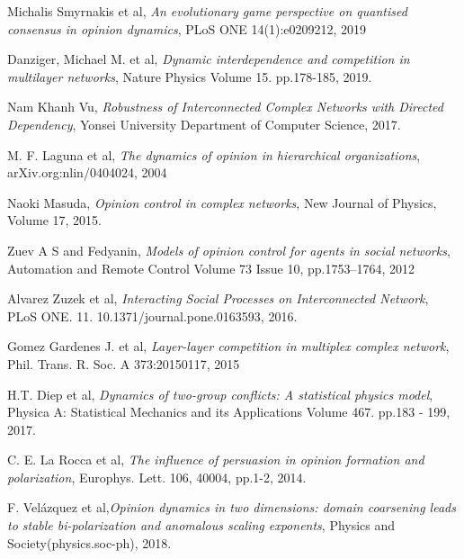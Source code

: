 \documentclass[english]{cccconf}
\begin{document}
\begin{thebibliography}{0}
Michalis Smyrnakis et al, \textit{An evolutionary game perspective on quantised consensus in opinion dynamics}, PLoS ONE 14(1):e0209212, 2019





Danziger, Michael M. et al, \textit{Dynamic interdependence and competition in multilayer networks}, Nature Physics Volume 15. pp.178-185, 2019.

Nam Khanh Vu, \textit{Robustness of Interconnected Complex Networks with Directed Dependency}, Yonsei University Department of Computer Science, 2017.

M. F. Laguna et al, \textit{The dynamics of opinion in hierarchical organizations}, arXiv.org:nlin/0404024, 2004 

Naoki Masuda, \textit{Opinion control in complex networks}, New Journal of Physics, Volume 17, 2015.

Zuev A S and Fedyanin, 
\textit{Models of opinion control for agents in social networks}, Automation and Remote Control Volume 73 Issue 10, pp.1753–1764, 2012 








Alvarez Zuzek et al, \textit{Interacting Social Processes on Interconnected Network}, PLoS ONE. 11. 10.1371/journal.pone.0163593, 2016.

Gomez Gardenes J. et al, \textit{Layer-layer competition in multiplex complex network}, Phil. Trans. R. Soc. A 373:20150117, 2015

H.T. Diep et al, \textit{Dynamics of two-group conflicts: A statistical physics model}, Physica A: Statistical Mechanics and its Applications Volume 467. pp.183 - 199, 2017.

C. E. La Rocca et al, \textit{The influence of persuasion in opinion formation and polarization}, Europhys. Lett. 106, 40004, pp.1-2, 2014.

F. Vel{\'a}zquez et al,\textit{Opinion dynamics in two dimensions: domain coarsening leads to stable bi-polarization and anomalous scaling exponents}, Physics and Society(physics.soc-ph), 2018. 









\end{thebibliography}
\end{document}
